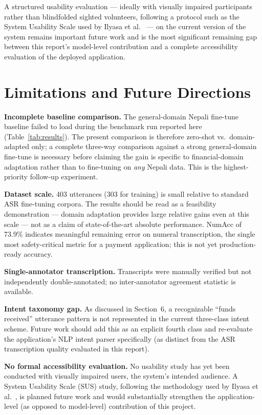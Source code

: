 \documentclass[11pt,a4paper]{article}
\begin{document}
A structured usability evaluation --- ideally with visually impaired
participants rather than blindfolded sighted volunteers, following a
protocol such as the System Usability Scale used by Ilyasa et
al.~\cite{ilyasa2023} --- on the current version of the system remains
important future work and is the most significant remaining gap
between this report's model-level contribution and a complete
accessibility evaluation of the deployed application.

\section{Limitations and Future Directions}

\textbf{Incomplete baseline comparison.} The general-domain Nepali
fine-tune baseline failed to load during the benchmark run reported here
(Table~\ref{tab:results}). The present comparison is therefore zero-shot
vs.\ domain-adapted only; a complete three-way comparison against a strong
general-domain fine-tune is necessary before claiming the gain is specific
to financial-domain adaptation rather than to fine-tuning on \textit{any}
Nepali data. This is the highest-priority follow-up experiment.

\textbf{Dataset scale.} 403 utterances (303 for training) is small relative
to standard ASR fine-tuning corpora. The results should be read as a
feasibility demonstration --- domain adaptation provides large relative
gains even at this scale --- not as a claim of state-of-the-art absolute
performance. NumAcc of 73.9\% indicates meaningful remaining error on
numeral transcription, the single most safety-critical metric for a
payment application; this is not yet production-ready accuracy.

\textbf{Single-annotator transcription.} Transcripts were manually
verified but not independently double-annotated; no inter-annotator
agreement statistic is available.

\textbf{Intent taxonomy gap.} As discussed in Section~6, a recognizable
``funds received'' utterance pattern is not represented in the current
three-class intent scheme. Future work should add this as an explicit
fourth class and re-evaluate the application's NLP intent parser
specifically (as distinct from the ASR transcription quality evaluated in
this report).

\textbf{No formal accessibility evaluation.} No usability study has yet
been conducted with visually impaired users, the system's intended
audience. A System Usability Scale (SUS) study, following the methodology
used by Ilyasa et al.~\cite{ilyasa2023}, is planned future work and would
substantially strengthen the application-level (as opposed to model-level)
contribution of this project.
\end{document}
